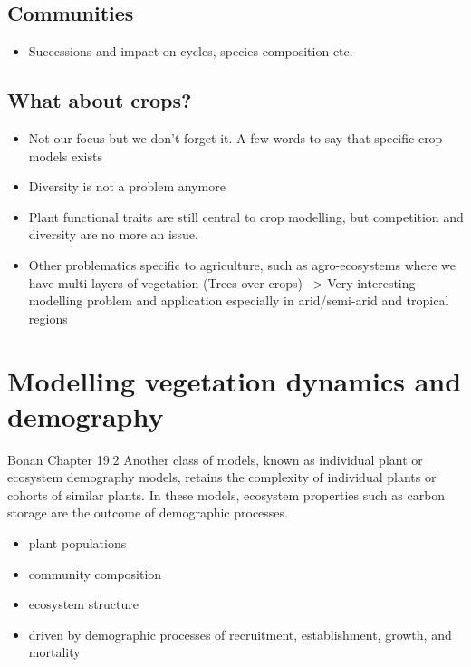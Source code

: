 \documentclass[oneside]{book}
\providecommand{\tightlist}{%
  \setlength{\itemsep}{0pt}\setlength{\parskip}{0pt}}
\begin{document}
\section{Communities}\label{communities}

\begin{itemize}
\tightlist
\item
  Successions and impact on cycles, species composition etc.
\end{itemize}

\section{What about crops?}\label{what-about-crops}

\begin{itemize}
\tightlist
\item
  Not our focus but we don't forget it. A few words to say that specific
  crop models exists
\item
  Diversity is not a problem anymore
\item
  Plant functional traits are still central to crop modelling, but
  competition and diversity are no more an issue.
\item
  Other problematics specific to agriculture, such as agro-ecosystems
  where we have multi layers of vegetation (Trees over crops)
  --\textgreater{} Very interesting modelling problem and application
  especially in arid/semi-arid and tropical regions
\end{itemize}

\chapter{Modelling vegetation dynamics and
demography}\label{modelling-vegetation-dynamics-and-demography}


Bonan Chapter 19.2 Another class of models, known as individual plant or
ecosystem demography models, retains the complexity of individual plants
or cohorts of similar plants. In these models, ecosystem properties such
as carbon storage are the outcome of demographic processes.

\begin{itemize}
\tightlist
\item
  plant populations
\item
  community composition
\item
  ecosystem structure
\item
  driven by demographic processes of recruitment, establishment, growth,
  and mortality
\end{itemize}
\end{document}

